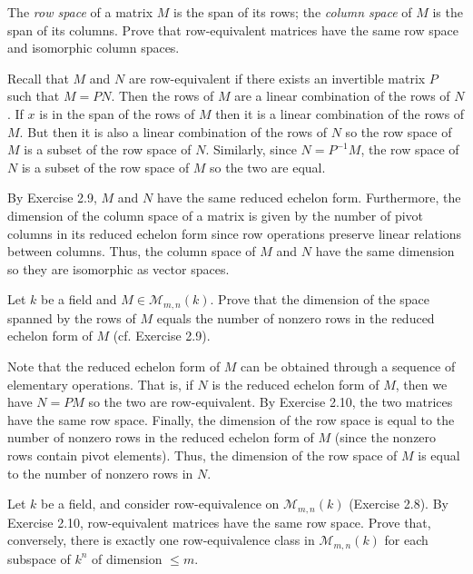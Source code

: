 \documentclass[../../master.tex]{subfiles}
\begin{document}
\begin{problem}
    The \textit{row space} of a matrix $M$ is the span of its rows;
    the \textit{column space} of $M$ is the span of its columns.
    Prove that row-equivalent matrices have the same row space and isomorphic column spaces.
\end{problem}

\begin{solution}
    Recall that $M$ and $N$ are row-equivalent if there exists an invertible matrix $P$ such that $M = PN$.
    Then the rows of $M$ are a linear combination of the rows of $N$.
    If $x$ is in the span of the rows of $M$ then it is a linear combination of the rows of $M$.
    But then it is also a linear combination of the rows of $N$ so the row space of $M$ is a subset of the row space of $N$.
    Similarly, since $N = P^{-1}M$, the row space of $N$ is a subset of the row space of $M$ so the two are equal.

    By Exercise 2.9, $M$ and $N$ have the same reduced echelon form.
    Furthermore, the dimension of the column space of a matrix is given by the number of pivot columns in its reduced echelon form since row operations preserve linear relations between columns.
    Thus, the column space of $M$ and $N$ have the same dimension so they are isomorphic as vector spaces.
\end{solution}

\begin{problem}
    Let $k$ be a field and $M \in \mathcal{M}_{m, n}(k)$.
    Prove that the dimension of the space spanned by the rows of $M$ equals the number of nonzero rows in the reduced echelon form of $M$ (cf. Exercise 2.9). 
\end{problem}

\begin{solution}
    Note that the reduced echelon form of $M$ can be obtained through a sequence of elementary operations.
    That is, if $N$ is the reduced echelon form of $M$, then we have $N = PM$ so the two are row-equivalent.
    By Exercise 2.10, the two matrices have the same row space.
    Finally, the dimension of the row space is equal to the number of nonzero rows in the reduced echelon form of $M$ (since the nonzero rows contain pivot elements).
    Thus, the dimension of the row space of $M$ is equal to the number of nonzero rows in $N$.
\end{solution}

\begin{problem}
    Let $k$ be a field, and consider row-equivalence on $\mathcal{M}_{m, n}(k)$ (Exercise 2.8).
    By Exercise 2.10, row-equivalent matrices have the same row space.
    Prove that, conversely, there is exactly one row-equivalence class in $\mathcal{M}_{m, n}(k)$ for each subspace of $k^{n}$ of dimension $\leq m$.
\end{problem}
\end{document}
